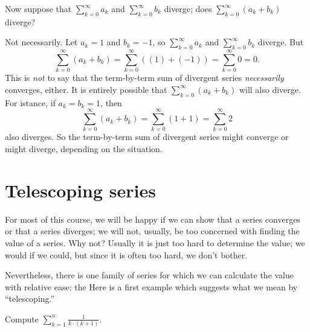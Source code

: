 \begin{example}
Now suppose that $\sum_{k=0}^\infty a_k$ and $\sum_{k=0}^\infty b_k$ diverge; does
$\sum_{k=0}^\infty (a_k+b_k)$ diverge?
\end{example}

\begin{solution}
  Not necessarily.  Let $a_k=1$ and $b_k=-1$, so $\sum_{k=0}^\infty
  a_k$ and $\sum_{k=0}^\infty b_k$ diverge. But
$$\sum_{k=0}^\infty (a_k+b_k)=\sum_{k=0}^\infty \left( \left( 1 \right) + \left( -1 \right) \right)=\sum_{k=0}^\infty 0 = 0.
$$
This is \textit{not} to say that the term-by-term sum of divergent
series \textit{necessarily} converges, either.  It is entirely
possible that $\sum_{k=0}^\infty (a_k+b_k)$ will also diverge.  For
istance, if $a_k=b_k=1$, then 
$$\sum_{k=0}^\infty (a_k+b_k)=\sum_{k=0}^\infty(1+1)=\sum_{k=0}^\infty 2
$$
also diverges.  So the term-by-term sum of divergent series might
converge or might diverge, depending on the situation.
\end{solution}

\section{Telescoping series}
\label{section:telescoping-series}

For most of this course, we will be happy if we can show that a series
converges or that a series diverges; we will not, usually, be too
concerned with finding the value of a series.  Why not?  Usually it is
just too hard to determine the value; we would if we could, but since
it is often too hard, we don't bother.

Nevertheless, there is one family of series for which we can calculate
the value with relative ease: the   Here
is a first example which suggests what we mean by ``telescoping.''

\begin{example}
Compute $\sum_{k=1}^n \frac{1}{k \cdot (k+1)}$.
\end{example}


